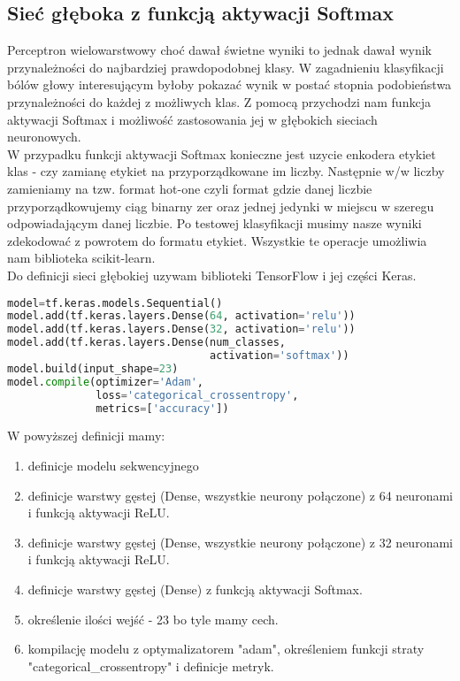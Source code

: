 \subsection{Sieć głęboka z funkcją aktywacji Softmax}
Perceptron wielowarstwowy choć dawał świetne wyniki to jednak dawał wynik przynależności do najbardziej prawdopodobnej klasy. W zagadnieniu klasyfikacji bólów głowy interesującym byłoby pokazać wynik w postać stopnia podobieństwa przynależności do każdej z możliwych klas. Z pomocą przychodzi nam funkcja aktywacji Softmax i możliwość zastosowania jej w głębokich sieciach neuronowych.\\

W przypadku funkcji aktywacji Softmax konieczne jest uzycie enkodera etykiet klas - czy zamianę etykiet na przyporządkowane im liczby. Następnie w/w liczby zamieniamy na tzw. format hot-one czyli format gdzie danej liczbie przyporządkowujemy ciąg binarny zer oraz jednej jedynki w miejscu w szeregu odpowiadającym danej liczbie. Po testowej klasyfikacji musimy nasze wyniki zdekodować z powrotem do formatu etykiet. Wszystkie te operacje umożliwia nam biblioteka scikit-learn.\\

Do definicji sieci głębokiej uzywam biblioteki TensorFlow i jej części Keras.
\begin{lstlisting}[language=Python, caption=Definicja sieci głębokiej z funkcją aktywacji Softmax]
model=tf.keras.models.Sequential()
model.add(tf.keras.layers.Dense(64, activation='relu'))
model.add(tf.keras.layers.Dense(32, activation='relu'))
model.add(tf.keras.layers.Dense(num_classes, 
                                activation='softmax'))
model.build(input_shape=23)
model.compile(optimizer='Adam',
              loss='categorical_crossentropy',
              metrics=['accuracy'])
\end{lstlisting}

W powyższej definicji mamy:
\begin{enumerate}
    \item definicje modelu sekwencyjnego
    \item definicje warstwy gęstej (Dense, wszystkie neurony połączone) z 64 neuronami i funkcją aktywacji ReLU.
    \item definicje warstwy gęstej (Dense, wszystkie neurony połączone) z 32 neuronami i funkcją aktywacji ReLU. 
    \item definicje warstwy gęstej (Dense) z funkcją aktywacji Softmax.
    \item określenie ilości wejść - 23 bo tyle mamy cech.
    \item kompilację modelu z optymalizatorem "adam", określeniem funkcji straty "categorical\_crossentropy" i definicje metryk.
\end{enumerate}


